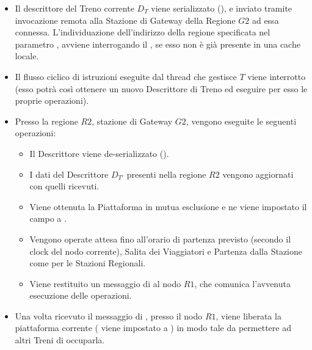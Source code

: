 \begin{itemize}
		\item Il descrittore del Treno corrente $D_T$ viene serializzato (), e inviato tramite invocazione remota alla Stazione di Gateway della Regione $G2$ ad essa connessa. L'individuazione dell'indirizzo della regione specificata nel parametro , avviene interrogando il , se esso non è già presente in una cache locale.
		\item Il flusso ciclico di istruzioni eseguite dal thread che gestisce $T$ viene interrotto (esso potrà così ottenere un nuovo Descrittore di Treno ed eseguire per esso le proprie operazioni).
		\item Presso la regione $R2$, stazione di Gateway $G2$, vengono eseguite le seguenti operazioni:
			\begin{itemize}
				\item Il Descrittore viene de-serializzato ().
				\item I dati del Descrittore $D_{T'}$ presenti nella regione $R2$ vengono aggiornati con quelli ricevuti.
				\item Viene ottenuta la Piattaforma in mutua esclusione e ne viene impostato il campo  a .
				\item Vengono operate attesa fino all'orario di partenza previsto (secondo il clock del nodo corrente), Salita dei Viaggiatori e Partenza dalla Stazione come per le Stazioni Regionali.
				\item Viene restituito un messaggio di  al nodo $R1$, che comunica l'avvenuta esecuzione delle operazioni.
			\end{itemize}
		\item Una volta ricevuto il messaggio di , presso il nodo $R1$, viene liberata la piattaforma corrente ( viene impostato a ) in modo tale da permettere ad altri Treni di occuparla.
	\end{itemize}
	
